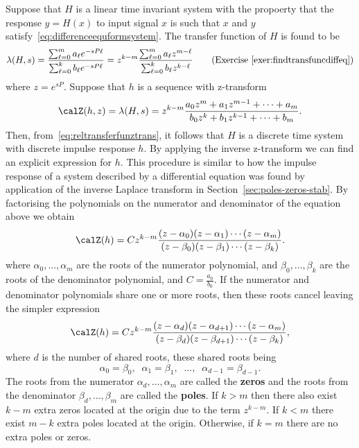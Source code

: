 \documentclass[11pt,a4paper]{book}
\theoremstyle{plain}
\numberwithin{equation}{section}
\newcommand{\term}{\textbf}
\begin{document}
Suppose that $H$ is a linear time invariant system with the propoerty that the response $y = H(x)$ to input signal $x$ is such that $x$ and $y$ satisfy~\eqref{eq:differenceequformsystem}.  The transfer function of $H$ is found to be
\[
\lambda(H,s) = \frac{\sum_{\ell=0}^{m} a_\ell e^{-sP\ell}}{\sum_{\ell=0}^{k} b_\ell e^{-sP\ell}} = z^{k-m} \frac{\sum_{\ell=0}^{m} a_\ell z^{m-\ell}}{\sum_{\ell=0}^{k} b_\ell z^{k-\ell}} \qquad \text{(Exercise~\ref{exer:findtransfuncdiffeq})}
\]
where $z = e^{sP}$.  Suppose that $h$ is a sequence with z-transform
\[
\calZ(h,z) = \lambda(H,s) = z^{k-m}\frac{a_0z^m + a_1 z^{m-1} + \dots + a_m}{b_0z^k + b_1 z^{k-1} + \dots + b_m}.
\]
Then, from~\eqref{eq:reltransferfunztrans}, it follows that $H$ is a discrete time system with discrete impulse response $h$.  By applying the inverse z-transform we can find an explicit expression for $h$.  This procedure is similar to how the impulse response of a system described by a differential equation was found by application of the inverse Laplace transform in Section~\ref{sec:poles-zeros-stab}.  By factorising the polynomials on the numerator and denominator of the equation above we obtain
\[
\calZ(h) = C z^{k-m}\frac{(z-\alpha_0)(z - \alpha_1)\cdots(z - \alpha_{m})}{(z-\beta_0)(z - \beta_1)\cdots(z - \beta_{k})}.
\]
where $\alpha_0, \dots, \alpha_m$ are the roots of the numerator polynomial, and $\beta_0, \dots, \beta_k$ are the roots of the denominator polynomial, and $C = \tfrac{a_0}{b_0}$.  If the numerator and denominator polynomials share one or more roots, then these roots cancel leaving the simpler expression
\begin{equation}\label{eq:ztransfuncpoleszeros}
\calZ(h) = C z^{k-m} \frac{(z-\alpha_d)(z - \alpha_{d+1})\cdots(z - \alpha_{m})}{(z-\beta_d)(z - \beta_{d+1})\cdots(z - \beta_{k})},
\end{equation}
where $d$ is the number of shared roots, these shared roots being 
\[
\alpha_0 = \beta_0, \;\; \alpha_1 = \beta_1, \;\; \dots, \;\;  \alpha_{d-1} = \beta_{d-1}.
\]
The roots from the numerator $\alpha_d, \dots, \alpha_m$ are called the \term{zeros} and the roots from the denominator $\beta_d, \dots, \beta_m$ are called the \term{poles}.  If $k>m$ then there also exist $k-m$ extra zeros located at the origin due to the term $z^{k-m}$.  If $k<m$ there exist $m-k$ extra poles located at the origin.  Otherwise, if $k=m$ there are no extra poles or zeros.
\end{document}
